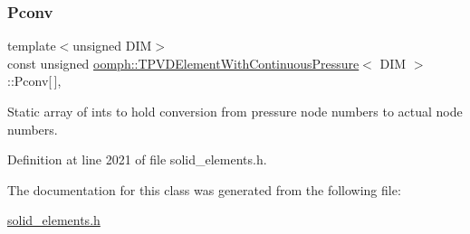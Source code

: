 \subsubsection{\texorpdfstring{Pconv}{Pconv}}
{\footnotesize\ttfamily template$<$unsigned D\+IM$>$ \\
const unsigned \hyperlink{classoomph_1_1TPVDElementWithContinuousPressure}{oomph\+::\+T\+P\+V\+D\+Element\+With\+Continuous\+Pressure}$<$ D\+IM $>$\+::Pconv\mbox{[}$\,$\mbox{]}\hspace{0.3cm}{\ttfamily [static]}, {\ttfamily [protected]}}



Static array of ints to hold conversion from pressure node numbers to actual node numbers. 



Definition at line 2021 of file solid\+\_\+elements.\+h.



The documentation for this class was generated from the following file\+:\begin{DoxyCompactItemize}
\item 
\hyperlink{solid__elements_8h}{solid\+\_\+elements.\+h}\end{DoxyCompactItemize}
